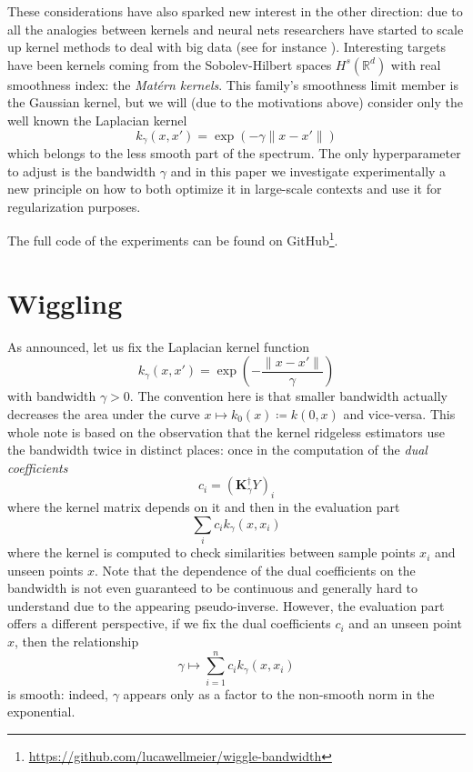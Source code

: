 \documentclass[12pt]{amsart}
\newcommand{\R}{\mathbb{R}}
\begin{document}
These considerations have also sparked new interest in the other direction:
due to all the analogies between kernels and neural nets researchers have
started to scale up kernel methods to deal with big data 
(see for instance \cite{falkon}).
Interesting targets have been kernels coming from the Sobolev-Hilbert spaces
$H^s(\R^d)$ with real smoothness index: the \emph{Matérn kernels}.
This family's smoothness limit member is the Gaussian kernel, but we will 
(due to the motivations above) 
consider only the well known the Laplacian kernel
\[ k_\gamma(x,x') = \exp(-\gamma \| x - x' \|) \]
which belongs to the less smooth part of the spectrum.
The only hyperparameter to adjust is the bandwidth $\gamma$ and in this 
paper we investigate experimentally a new principle on how to both optimize 
it in large-scale contexts and use it for regularization purposes.

The full code of the experiments can be found 
on GitHub\footnote{\url{https://github.com/lucawellmeier/wiggle-bandwidth}}.

\section{Wiggling}

As announced, let us fix the Laplacian kernel function
\[ k_\gamma(x,x') = \exp\left(-\frac{\| x - x' \|}{\gamma} \right) \]
with bandwidth $\gamma > 0$.
The convention here is that smaller bandwidth actually decreases the 
area under the curve $x \mapsto k_0(x) \coloneqq k(0,x)$ and vice-versa.
This whole note is based on the observation that the kernel ridgeless 
estimators use the bandwidth twice in distinct places:
once in the computation of the \emph{dual coefficients}
\[ c_i = (\mathbf K_\gamma^\dagger Y)_i \]
where the kernel matrix depends on it and then
in the evaluation part
\[ \sum_i c_i k_\gamma(x,x_i) \]
where the kernel is computed to check similarities between sample 
points $x_i$ and unseen points $x$.
Note that the dependence of the dual coefficients on the bandwidth is 
not even guaranteed to be continuous and generally hard to understand
due to the appearing pseudo-inverse.
However, the evaluation part offers a different perspective, if we 
fix the dual coefficients $c_i$ and an unseen point $x$, then
the relationship
\[ \gamma \mapsto \sum_{i=1}^n c_i k_\gamma(x,x_i) \]
is smooth: indeed, $\gamma$ appears only as a factor to the non-smooth
norm in the exponential.
\end{document}
